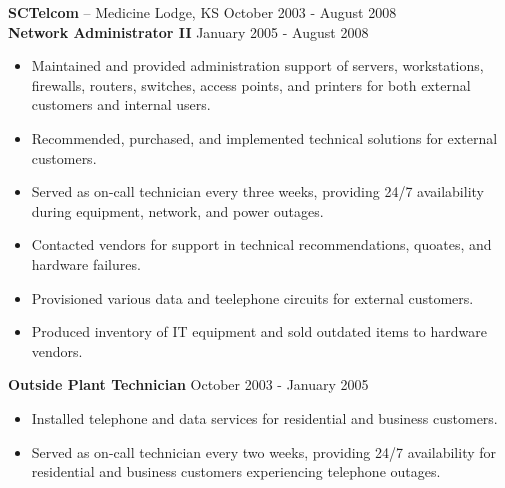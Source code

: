 \documentclass[11pt]{article}       %
\begin{document}
\textbf{SCTelcom} -- Medicine Lodge, KS \hfill October 2003 - August 2008 \\
\textbf{Network Administrator II} \hfill January 2005 - August 2008 \\
\vspace{-9pt}
\begin{itemize}
  \item Maintained and provided administration support of servers, workstations, firewalls, routers, switches, access points, and printers for both external customers and internal users.
  \item Recommended, purchased, and implemented technical solutions for external customers.
  \item Served as on-call technician every three weeks, providing 24/7 availability during equipment, network, and power outages.
  \item Contacted vendors for support in technical recommendations, quoates, and hardware failures.
  \item Provisioned various data and teelephone circuits for external customers.
  \item Produced inventory of IT equipment and sold outdated items to hardware vendors.
\end{itemize}

\textbf{Outside Plant Technician} \hfill October 2003 - January 2005 \\
\vspace{-9pt}
\begin{itemize}
  \item Installed telephone and data services for residential and business customers.
  \item Served as on-call technician every two weeks, providing 24/7 availability for residential and business customers experiencing telephone outages.
\end{itemize}

\vspace{-18.5pt}

\end{document}

